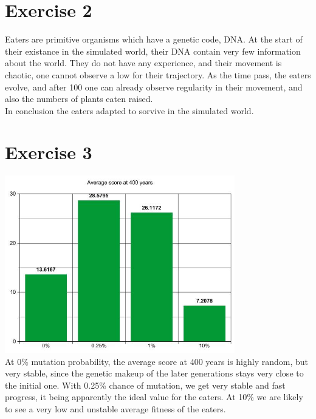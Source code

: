 \documentclass[a4paper,10pt]{article}
\begin{document}
\section*{Exercise 2}
Eaters are primitive organisms which have a genetic code, DNA. At the start of their existance in the simulated world,
their DNA contain very few information about the world. They do not have any experience, and their movement is chaotic,
one cannot observe a low for their trajectory. As the time pass, the eaters evolve, and after 100 one can already observe
regularity in their movement, and also the numbers of plants eaten raised.\\ In conclusion the eaters adapted to sorvive
in the simulated world.

\section*{Exercise 3}
\includegraphics[width=10cm]{graphEx3.jpg}\\
At 0\% mutation probability, the average score at 400 years is highly random, but very stable, since the genetic makeup of the later generations stays very close to the initial one. With 0.25\% chance of mutation, we get very stable and fast progress, it being apparently the ideal value for the eaters. At 10\% we are likely to see a very low and unstable average fitness of the eaters.
\end{document}
